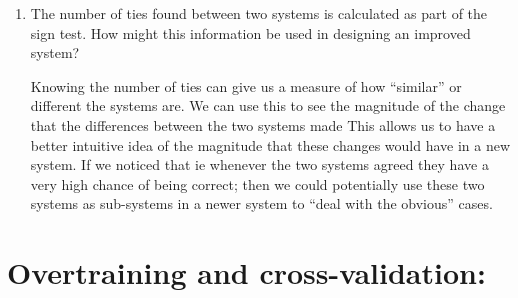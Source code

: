 \documentclass[10pt,\jkfside,a4paper]{article}
\begin{document}
\begin{enumerate}
\item The number of ties found between two systems is calculated as part of the
sign test. How might this information be used in designing an improved
system?

Knowing the number of ties can give us a measure of how ``similar'' or different the systems are. 
We can use this to see the magnitude of the change that the differences between the two systems made 
This allows us to have a better intuitive idea of the magnitude that these changes would have in a new system. 
If we noticed that ie whenever the two systems agreed they have a very high chance of being correct; then 
we could potentially use these two systems as sub-systems in a newer system to ``deal with the obvious'' cases.

\end{enumerate}

\section*{Overtraining and cross-validation:}
\end{document}
